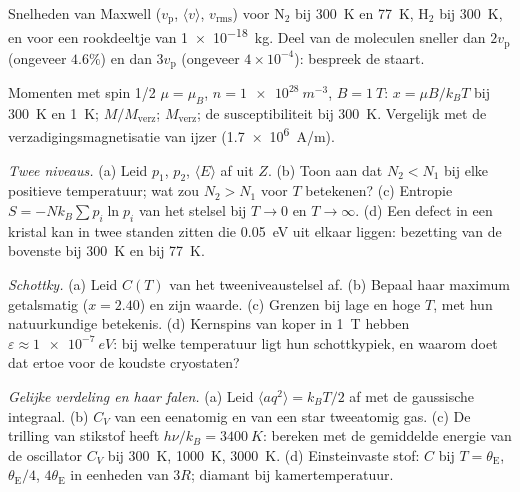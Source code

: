 \begin{exercise}[$\star$]\label{exo:b2:boltzmann-factor:3}
Snelheden van Maxwell ($v_{\text{p}}$, $\langle v\rangle$, $v_{\text{rms}}$)
voor N$_2$
bij \qty{300}{K} en \qty{77}{K}, H$_2$ bij \qty{300}{K}, en voor een rookdeeltje
van \qty{1e-18}{kg}. Deel van de moleculen sneller dan $2v_{\text{p}}$
(ongeveer $4.6\%$) en dan $3v_{\text{p}}$ (ongeveer $4 \times 10^{-4}$): bespreek
de staart.
\end{exercise}

\begin{exercise}[$\star$]\label{exo:b2:boltzmann-factor:4}
Momenten met spin 1/2 $\mu = \mu_B$, $n = \qty{1e28}{m^{-3}}$, $B = \qty{1}{T}$:
$x = \mu B/k_BT$ bij \qty{300}{K} en \qty{1}{K}; $M/M_{\text{verz}}$;
$M_{\text{verz}}$;
de susceptibiliteit bij \qty{300}{K}. Vergelijk met de verzadigingsmagnetisatie
van ijzer (\qty{1.7e6}{A/m}).
\end{exercise}

\begin{exercise}[$\star\star$]\label{exo:b2:boltzmann-factor:5}
\emph{Twee niveaus.} (a) Leid $p_1$, $p_2$, $\langle E\rangle$ af uit $Z$. (b)
Toon aan dat $N_2 < N_1$ bij elke positieve temperatuur; wat zou $N_2 >
N_1$
voor $T$ betekenen? (c) Entropie $S = -Nk_B\sum p_i\ln p_i$ van het stelsel
bij
$T \to 0$ en $T \to \infty$. (d) Een defect in een kristal kan in twee
standen zitten die \qty{0.05}{eV} uit elkaar liggen: bezetting van de bovenste bij
\qty{300}{K} en bij \qty{77}{K}.
\end{exercise}

\begin{exercise}[$\star\star$]\label{exo:b2:boltzmann-factor:6}
\emph{Schottky.} (a) Leid $C(T)$ van het tweeniveaustelsel af. (b) Bepaal
haar maximum getalsmatig ($x = 2.40$) en zijn waarde. (c) Grenzen bij lage
en hoge $T$, met hun natuurkundige betekenis. (d) Kernspins van koper
in \qty{1}{T} hebben $\varepsilon \approx \qty{1e-7}{eV}$: bij welke
temperatuur ligt
hun schottkypiek, en waarom doet dat ertoe voor de koudste
cryostaten?
\end{exercise}

\begin{exercise}[$\star\star$]\label{exo:b2:boltzmann-factor:7}
\emph{Gelijke verdeling en haar falen.} (a) Leid
$\langle aq^2\rangle =
k_BT/2$ af met de gaussische integraal. (b) $C_V$ van
een eenatomig en van een
star tweeatomig gas. (c) De trilling van stikstof heeft $h\nu/k_B = \qty{3400}{K}$:
bereken met de gemiddelde energie van de oscillator $C_V$ bij \qty{300}{K},
\qty{1000}{K},
\qty{3000}{K}. (d) Einsteinvaste stof: $C$ bij $T = \theta_{\text{E}}$,
$\theta_{\text{E}}/4$,
$4\theta_{\text{E}}$ in eenheden van $3R$; diamant bij kamertemperatuur.
\end{exercise}


